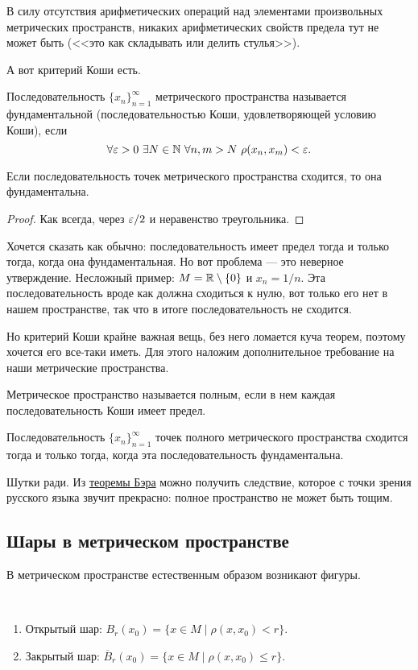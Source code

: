 В силу отсутствия арифметических операций над элементами произвольных метрических пространств, никаких арифметических свойств предела тут не может быть (<<это как складывать или делить стулья>>).

А вот критерий Коши есть.
\begin{Def}
Последовательность $\{x_n\}_{n=1}^\infty$ метрического пространства называется фундаментальной (последовательностью Коши, удовлетворяющей условию Коши), если
$$
\forall \varepsilon > 0 \ \exists N \in \mathbb{N}\ \forall n, m > N\ \rho(x_n, x_m) < \varepsilon.
$$
\end{Def}
\begin{Statement}
	Если последовательность точек метрического пространства сходится, то она фундаментальна.
\end{Statement}
\begin{proof}
	 Как всегда, через $\varepsilon/2$ и неравенство треугольника.
\end{proof}
Хочется сказать как обычно: последовательность имеет предел тогда и только тогда, когда она фундаментальная. Но вот проблема --- это неверное утверждение. Несложный пример: $M = \mathbb{R}\setminus\{0\}$ и $x_n = 1/n$. Эта последовательность вроде как должна сходиться к нулю, вот только его нет в нашем пространстве, так что в итоге последовательность не сходится.

Но критерий Коши крайне важная вещь, без него ломается куча теорем, поэтому хочется его все-таки иметь. Для этого наложим дополнительное требование на наши метрические пространства.
\begin{Def}
Метрическое пространство называется полным, если в нем каждая последовательность Коши имеет предел.
\end{Def}

\begin{Theorem}
Последовательность $\{x_n\}_{n=1}^\infty$ точек полного метрического пространства сходится тогда и только тогда, когда эта последовательность фундаментальна.
\end{Theorem}

\begin{Comment}
Шутки ради. Из \href{https://goo.gl/drRQz0}{теоремы Бэра} можно получить следствие, которое с точки зрения русского языка звучит прекрасно: полное пространство не может быть тощим.
\end{Comment}

\subsection{Шары в метрическом пространстве}
В метрическом пространстве естественным образом возникают фигуры.
\begin{Def}\ 
\begin{enumerate}
\item Открытый шар: $B_r(x_0) = \{x \in M \mid \rho(x, x_0) < r  \}$.
\item Закрытый шар: $\overline{B}_r(x_0) = \{x \in M \mid \rho(x, x_0) \leq r  \}$.
\end{enumerate}
\end{Def}

